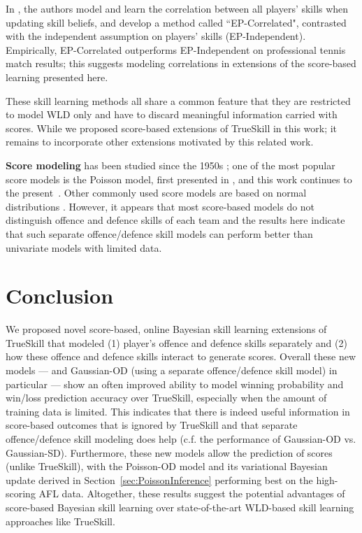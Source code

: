 \documentclass[runningheads,a4paper]{llncs}
\begin{document}
In \cite{birlutiu07ExpectationPropagation}, the authors model and learn the
correlation between all players' skills when updating skill beliefs, and
develop a method called ``EP-Correlated", contrasted with the
independent assumption on players' skills
(EP-Independent).  Empirically, EP-Correlated outperforms
EP-Independent on professional tennis match results;
this suggests modeling correlations in extensions of the
score-based learning presented here.

These skill learning methods all share a common feature that they are
restricted to model WLD only and have to discard meaningful
information carried with scores.  While we proposed score-based extensions
of TrueSkill in this work; it remains to incorporate other extensions
motivated by this related work.

{\bf Score modeling} has been studied since the 1950s
\cite{Moroney56FactsFromFigures}
\cite{dixon97ModellingAssociationFootball} \cite{Glickman98JASA}
\cite{Karlis03AnalysisOfSportsData}
\cite{karlis09BayesianModellingFootballOutcomes}; one of the most
popular score models is the Poisson model, first presented in
\cite{Moroney56FactsFromFigures}, and this work continues to the
present~\cite{karlis09BayesianModellingFootballOutcomes}. Other
commonly used score models are based on normal distributions
\cite{Glickman98JASA}. However, it appears that most score-based
models do not distinguish offence and defence skills of each team and
the results here indicate that such separate offence/defence skill
models can perform better than univariate models with limited data.

\section{Conclusion}

We proposed novel score-based, online Bayesian skill learning extensions of
TrueSkill that modeled (1) player's offence and defence skills
separately and (2) how these offence and defence skills
interact to generate scores.  Overall these new models --- and
Gaussian-OD (using a separate offence/defence skill model) in particular ---
show an often improved ability to model winning probability and
win/loss prediction accuracy over TrueSkill, especially when the
amount of training data is limited.  This indicates that there is
indeed useful information in score-based outcomes that is ignored by
TrueSkill and that separate offence/defence skill modeling does help
(c.f. the performance of Gaussian-OD vs. Gaussian-SD).  Furthermore,
these new models allow the prediction of scores (unlike TrueSkill),
with the Poisson-OD model and its variational Bayesian update derived
in Section~\ref{sec:PoissonInference} performing best on the
high-scoring AFL data.  Altogether, these results suggest the
potential advantages of score-based Bayesian skill learning over
state-of-the-art WLD-based skill learning approaches like TrueSkill.
\end{document}
